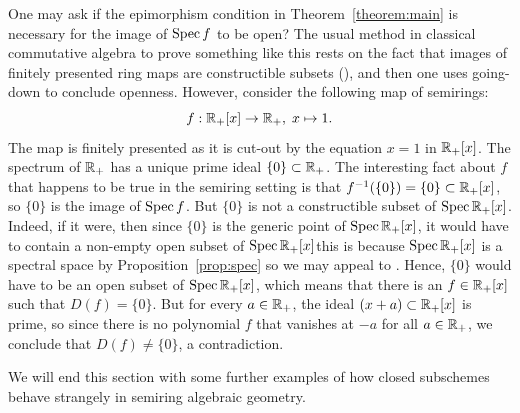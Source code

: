 \begin{remark}\label{rem:badclosed}
One may ask if the epimorphism condition in Theorem~\ref{theorem:main} is necessary for the image of $\operatorname{Spec}{f}$ to be open?
The usual method in classical commutative algebra to prove something like this rests on the fact that images of finitely presented
ring maps are constructible subsets (\cite[Tag 054k]{sp}), and then one uses going-down to conclude openness. However, consider the following map of semirings:
\[f: \mathbb{R}_{+}[x] \rightarrow \mathbb{R}_+, \; x \mapsto 1.\]
The map is finitely presented as it is cut-out by the equation $x=1$ in $\mathbb{R}_{+}[x]$. The spectrum of $\mathbb{R}_{+}$ has a unique prime ideal $\{0\} \subset \mathbb{R}_{+}$. 
The interesting fact about $f$ that happens to be true in the semiring setting is that $f^{-1}(\{0\}) = \{0\} \subset \mathbb{R}_{+}[x]$, so $\{0\}$ is the image of $\operatorname{Spec}{f}$. 
But $\{0\}$ is not a constructible subset of $\operatorname{Spec}{\mathbb{R}_{+}[x]}$. Indeed, if it were, then since $\{0\}$ is the generic point of $\operatorname{Spec}{\mathbb{R}_{+}[x]}$, 
it would have to contain a non-empty open subset of $\operatorname{Spec}{\mathbb{R}_{+}[x]}$\textemdash this is because $\operatorname{Spec}{\mathbb{R}_{+}[x]}$ is a spectral space by Proposition~\ref{prop:spec} so 
we may appeal to \cite[Tag 0AAW]{sp}. 
Hence, $\{0\}$ would have to be an open subset of $\operatorname{Spec}{\mathbb{R}_{+}[x]}$, which means that there is an $f \in \mathbb{R}_{+}[x]$ such that $D(f) = \{0\}$. 
But for every $a \in \mathbb{R}_{+}$, the ideal $(x+a) \subset \mathbb{R}_{+}[x]$ is prime, so since there is no polynomial $f$ that vanishes at $-a$ for all $a \in \mathbb{R}_{+}$, 
we conclude that $D(f) \neq \{0\}$, a contradiction.
\end{remark}
We will end this section with some further examples of how closed subschemes behave strangely in semiring algebraic geometry.
